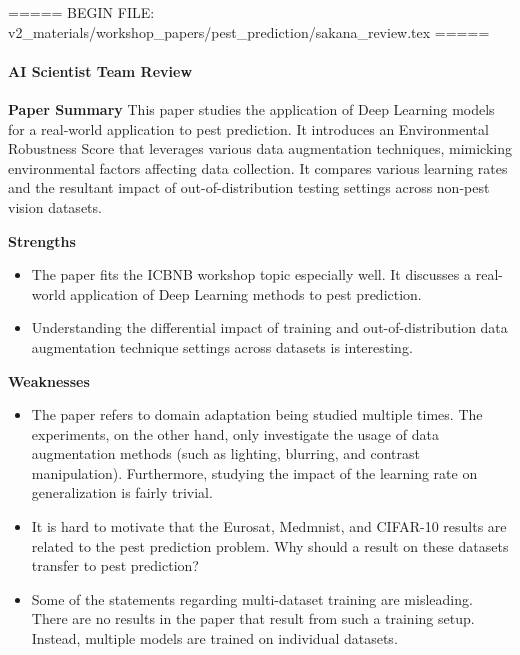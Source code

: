 ===== BEGIN FILE: v2_materials/workshop_papers/pest_prediction/sakana_review.tex =====
\paragraph{AI Scientist Team Review}

\textbf{Paper Summary}
This paper studies the application of Deep Learning models for a real-world application to pest prediction. It introduces an Environmental Robustness Score that leverages various data augmentation techniques, mimicking environmental factors affecting data collection. It compares various learning rates and the resultant impact of out-of-distribution testing settings across non-pest vision datasets.

\textbf{Strengths}

\begin{itemize}
    \item The paper fits the ICBNB workshop topic especially well. It discusses a real-world application of Deep Learning methods to pest prediction.
    \item Understanding the differential impact of training and out-of-distribution data augmentation technique settings across datasets is interesting.
\end{itemize}

\textbf{Weaknesses}
\begin{itemize}
    \item The paper refers to domain adaptation being studied multiple times. The experiments, on the other hand, only investigate the usage of data augmentation methods (such as lighting, blurring, and contrast manipulation). Furthermore, studying the impact of the learning rate on generalization is fairly trivial.
    \item It is hard to motivate that the Eurosat, Medmnist, and CIFAR-10 results are related to the pest prediction problem. Why should a result on these datasets transfer to pest prediction?
    \item Some of the statements regarding multi-dataset training are misleading. There are no results in the paper that result from such a training setup. Instead, multiple models are trained on individual datasets.
\end{itemize}



